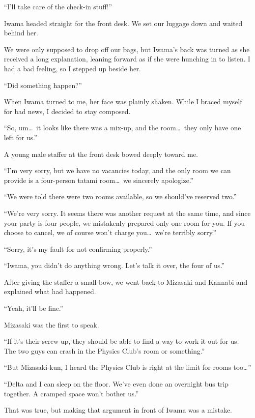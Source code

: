 \documentclass[
    a4paper,
    12pt,
    twoside,
    openany,
    UTF8,
    fontset=windows
]{ctexbook}
\begin{document}
``I'll take care of the check-in stuff!''

Iwama headed straight for the front desk. We set our luggage down and waited behind her.

We were only supposed to drop off our bags, but Iwama's back was turned as she received a long explanation, leaning forward as if she were hunching in to listen. I had a bad feeling, so I stepped up beside her.

``Did something happen?''

When Iwama turned to me, her face was plainly shaken. While I braced myself for bad news, I decided to stay composed.

``So, um\dots\ it looks like there was a mix-up, and the room\dots\ they only have one left for us.''

A young male staffer at the front desk bowed deeply toward me.

``I'm very sorry, but we have no vacancies today, and the only room we can provide is a four-person tatami room\dots\ we sincerely apologize.''

``We were told there were two rooms available, so we should've reserved two.''

``We're very sorry. It seems there was another request at the same time, and since your party is four people, we mistakenly prepared only one room for you. If you choose to cancel, we of course won't charge you\dots\ we're terribly sorry.''

``Sorry, it's my fault for not confirming properly.''

``Iwama, you didn't do anything wrong. Let's talk it over, the four of us.''

After giving the staffer a small bow, we went back to Mizasaki and Kannabi and explained what had happened.

``Yeah, it'll be fine.''

Mizasaki was the first to speak.

``If it's their screw-up, they should be able to find a way to work it out for us. The two guys can crash in the Physics Club's room or something.''

``But Mizasaki-kun, I heard the Physics Club is right at the limit for rooms too\dots''

``Delta and I can sleep on the floor. We've even done an overnight bus trip together. A cramped space won't bother us.''

That was true, but making that argument in front of Iwama was a mistake.
\end{document}
